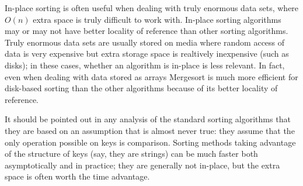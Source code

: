 \documentclass[12pt]{article}
\begin{document}
In-place sorting is often useful when dealing with truly enormous data sets, where $O(n)$ extra space is truly difficult to work with.  In-place sorting algorithms may or may not have better locality of reference than other sorting algorithms.  Truly enormous data sets are usually stored on media where random access of data is very expensive but extra storage space is realtively inexpensive (such as disks); in these cases, whether an algorithm is in-place is less relevant.  In fact, even when dealing with data stored as arrays Mergesort is much more efficient for disk-based sorting than the other algorithms because of its better locality of reference. 

It should be pointed out in any analysis of the standard sorting algorithms that they are based on an assumption that is almost never true: they assume that the only operation possible on keys is comparison.  Sorting methods taking advantage of the structure of keys (say, they are strings) can be much faster both asymptotically and in practice; they are generally not in-place, but the extra space is often worth the time advantage.
\end{document}
